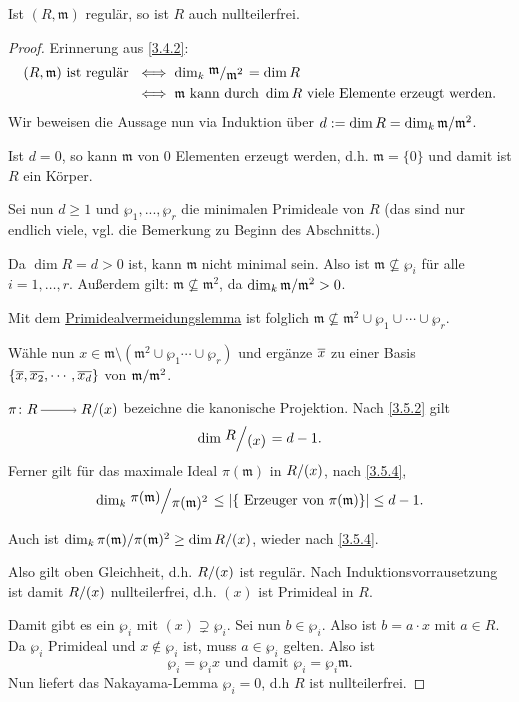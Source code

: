 \documentclass[a4paper,12pt,index=toc]{scrbook}
\theoremstyle{keinenummern} %
\def\m{\mathfrak{m}}
\renewcommand{\dotsc}{\ensuremath{\!...}}
\def\Bar#1{\ensuremath\overline{#1}}
\begin{document}
\begin{prop}\label{3.5.5}
Ist $(R,\m)$ regulär, so ist $R$ auch nullteilerfrei.
\end{prop}
\begin{proof} Erinnerung aus \cref{3.4.2}: 
\begin{align*}
(R,\m) \text{ ist regulär }& \iff \dim_k \Quotient{\m}{\m^2}=\dim R\\
&\iff \m\text{ kann durch } \dim R\text{ viele Elemente erzeugt werden.}
\end{align*}
Wir beweisen die Aussage nun via Induktion über $d:=\dim R=\dim_{k}\Quotient{\m}{\m^2}$.

Ist $d=0$, so kann $\m$ von $0$ Elementen erzeugt werden, d.h. $\m=\{0\}$ und damit ist $R$ ein Körper.

Sei nun $d\ge 1$ und $\wp_1,\dotsc,\wp_r$ die minimalen Primideale von $R$ (das sind nur endlich viele, vgl. die Bemerkung zu Beginn des Abschnitts.)

Da $\dim R=d>0$ ist, kann $\m$ nicht minimal sein. Also ist $\m \nsubseteq \wp_i$ für alle $i=1,\dots,r$. Außerdem gilt: $\m \nsubseteq \m^2$, da $\dim_{k} \Quotient{\m}{\m^2}>0$.

Mit dem \hyperref[pivl]{Primidealvermeidungslemma} ist folglich $\m\nsubseteq \m^2\cup \wp_1\cup\dotsm \cup \wp_r$.

Wähle nun $x\in \m\setminus (\m^2\cup \wp_1\dotsm\cup \wp_r)$ und ergänze $\Bar{x}$ zu einer Basis $\{\Bar{x},\Bar{x_2},\dotsm,\Bar{x_d}\}$ von $\Quotient{\m}{\m^2}$.

$\pi\colon R\ra \Quotient{R}{(x)}$ bezeichne die kanonische Projektion. Nach \cref{3.5.2} gilt \begin{equation*}\dim \Quotient{R}{(x)}=d-1.\end{equation*} Ferner gilt für das maximale Ideal $\pi(\m)$ in $\Quotient{R}{(x)}$, nach \cref{3.5.4},
 \begin{equation*}\dim_{k} \Quotient{\pi(\m) }{\pi(\m)^2} \le |\{\text{ Erzeuger von }\pi(\m)\}|\le d-1.\end{equation*}

Auch ist $\dim_{k} \Quotient{\pi(\m)}{\pi(\m)^2} \ge \dim\Quotient{R}{(x)}$, wieder nach \cref{3.5.4}.

Also gilt oben Gleichheit, d.h. $\Quotient{R}{(x)}$ ist regulär. Nach Induktionsvorrausetzung ist damit $\Quotient{R}{(x)}$ nullteilerfrei, d.h. $(x)$ ist Primideal in $R$.

Damit gibt es ein $\wp_i$ mit $(x)\supsetneq \wp_i$. Sei nun $b\in \wp_i$. Also ist $b=a\cdot x$ mit $a\in R$. Da $\wp_i$ Primideal und $x\notin \wp_i$ ist, muss $a\in \wp_i$ gelten. Also ist \begin{equation*}\wp_i=\wp_i x\text{ und damit }\wp_i=\wp_i \m.\end{equation*}
Nun liefert das Nakayama-Lemma $\wp_i=0$, d.h $R$ ist nullteilerfrei.
\end{proof}
\end{document}
